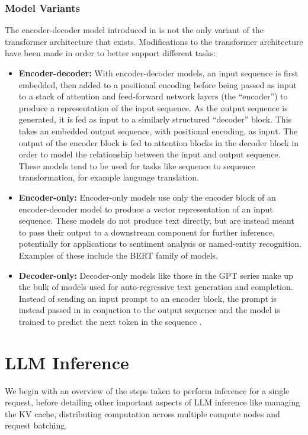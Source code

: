 \documentclass[12pt,twoside]{report}
\begin{document}
\subsubsection{Model Variants}
The encoder-decoder model introduced in \cite{vaswani2017attention} is not the only variant of the transformer architecture that exists.
Modifications to the transformer architecture have been made in order to better support different tasks:  
\begin{itemize}
  \item \textbf{Encoder-decoder:}
    With encoder-decoder models, an input sequence is first embedded, then added to a positional encoding before being passed as input to a stack of attention and feed-forward network layers (the ``encoder'') to produce a representation of the input sequence. 
    As the output sequence is generated, it is fed as input to a similarly structured ``decoder'' block. 
    This takes an embedded output sequence, with positional encoding, as input.
    The output of the encoder block is fed to attention blocks in the decoder block in order to model the relationship between the input and output sequence.
    These models \cite{raffel2020exploring} tend to be used for tasks like sequence to sequence transformation, for example language translation.
  \item \textbf{Encoder-only:}
    Encoder-only models use only the encoder block of an encoder-decoder model to produce a vector representation of an input sequence.
    These models do not produce text directly, but are instead meant to pass their output to a downstream component for further inference, potentially for applications to sentiment analysis or named-entity recognition.
    Examples of these include the BERT \cite{kenton2019bert} family of models.
  \item \textbf{Decoder-only:}
    Decoder-only models like those in the GPT \cite{radford2018improving} series make up the bulk of models used for auto-regressive text generation and completion. 
    Instead of sending an input prompt to an encoder block, the prompt is instead passed in in conjuction to the output sequence and the model is trained to predict the next token in the sequence \cite{dai2015semi}.
\end{itemize}

\section{LLM Inference}\label{section:llminference}
We begin with an overview of the steps taken to perform inference for a single request, before detailing other important aspects of LLM inference like managing the KV cache, distributing computation across multiple compute nodes and request batching.
\end{document}

